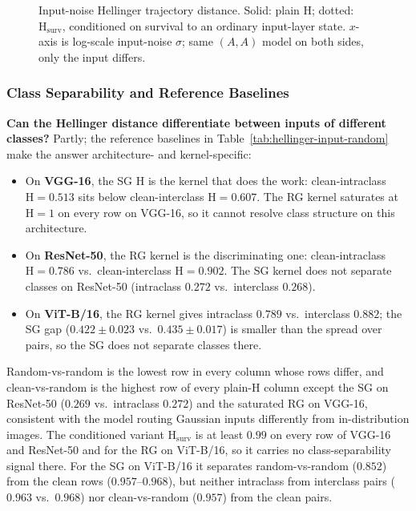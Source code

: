 \documentclass[twoside]{article}
\newcommand{\1}{\mathbf{1}}
\begin{document}
\begin{figure}[H]
    \centering
    
    \caption{Input-noise Hellinger trajectory distance. Solid: plain $\mathrm{H}$; dotted:
    $\mathrm{H}_{\mathrm{surv}}$, conditioned on survival to an ordinary input-layer state. $x$-axis is
    log-scale input-noise $\sigma$; same $(A,A)$ model on both sides, only the input differs.}
    \label{fig:hellinger-input-noise}
\end{figure}

\subsubsection{Class Separability and Reference Baselines}\label{sec:input-noise-baselines}

\textbf{Can the Hellinger distance differentiate between inputs of different classes?} Partly; the
reference baselines in Table~\ref{tab:hellinger-input-random} make the answer architecture- and
kernel-specific:
\begin{itemize}
    \item On \textbf{VGG-16}, the \ac{SG} $\mathrm{H}$ is the kernel that does the work: clean-intraclass
        $\mathrm{H}=0.513$ sits below clean-interclass $\mathrm{H}=0.607$. The \ac{RG} kernel saturates at
        $\mathrm{H}=1$ on every row on VGG-16, so it cannot resolve class structure on this architecture.
    \item On \textbf{ResNet-50}, the \ac{RG} kernel is the discriminating one: clean-intraclass
        $\mathrm{H}=0.786$ vs.\ clean-interclass $\mathrm{H}=0.902$. The \ac{SG} kernel does not separate
        classes on ResNet-50 (intraclass $0.272$ vs.\ interclass $0.268$).
    \item On \textbf{ViT-B/16}, the \ac{RG} kernel gives intraclass $0.789$ vs.\ interclass $0.882$; the
        \ac{SG} gap ($0.422 \pm 0.023$ vs.\ $0.435 \pm 0.017$) is smaller than the spread over pairs, so
        the \ac{SG} does not separate classes there.
\end{itemize}
Random-vs-random is the lowest row in every column whose rows differ, and clean-vs-random is the
highest row of every plain-$\mathrm{H}$ column except the \ac{SG} on ResNet-50 ($0.269$ vs.\
intraclass $0.272$) and the saturated \ac{RG} on VGG-16, consistent with the model routing Gaussian
inputs differently from in-distribution images. The conditioned variant
$\mathrm{H}_{\mathrm{surv}}$ is at least $0.99$ on every row of VGG-16 and ResNet-50 and for the
\ac{RG} on ViT-B/16, so it carries no class-separability signal there. For the \ac{SG} on ViT-B/16
it separates random-vs-random ($0.852$) from the clean rows ($0.957$--$0.968$), but neither
intraclass from interclass pairs ($0.963$ vs.\ $0.968$) nor clean-vs-random ($0.957$) from the
clean pairs.
\end{document}
